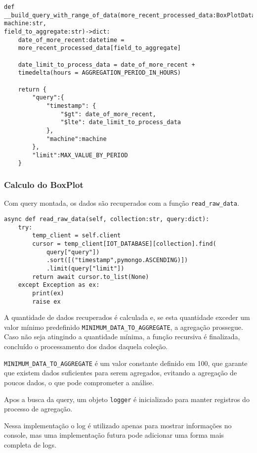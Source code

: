 \begin{verbatim}
def __build_query_with_range_of_data(more_recent_processed_data:BoxPlotData,
machine:str,
field_to_aggregate:str)->dict:
    date_of_more_recent:datetime = 
    more_recent_processed_data[field_to_aggregate]

    date_limit_to_process_data = date_of_more_recent + 
    timedelta(hours = AGGREGATION_PERIOD_IN_HOURS)

    return {
        "query":{
            "timestamp": {
                "$gt": date_of_more_recent,
                "$lte": date_limit_to_process_data
            },
            "machine":machine
        },
        "limit":MAX_VALUE_BY_PERIOD
    }

\end{verbatim}

\subsubsection{Calculo do BoxPlot}
Com query montada, os dados são recuperados com a função \texttt{read\_raw\_data}.

\begin{verbatim}
async def read_raw_data(self, collection:str, query:dict):
    try:
        temp_client = self.client
        cursor = temp_client[IOT_DATABASE][collection].find(
            query["query"])
            .sort([("timestamp",pymongo.ASCENDING)])
            .limit(query["limit"])
        return await cursor.to_list(None)
    except Exception as ex:
        print(ex)
        raise ex
\end{verbatim}

A quantidade de dados recuperados é calculada e, se esta quantidade exceder um valor mínimo predefinido \texttt{MINIMUM\_DATA\_TO\_AGGREGATE}, a agregação prossegue. Caso não seja atingindo a quantidade mínima, a função recursiva é finalizada, concluído o processamento dos dados daquela coleção.

\texttt{MINIMUM\_DATA\_TO\_AGGREGATE} é um valor constante definido em 100, que garante que existem dados suficientes para serem agregados, evitando a agregação de poucos dados, o que pode comprometer a análise. 

Apos a busca da query, um objeto \texttt{logger} é inicializado para manter registros do processo de agregação.

Nessa implementação o log é utilizado apenas para mostrar informações no console, mas uma implementação futura pode adicionar uma forma mais completa de logs.

